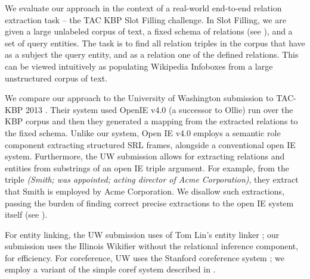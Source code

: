We evaluate our approach in the context of a real-world end-to-end 
  relation extraction task -- the TAC KBP Slot Filling challenge.
In Slot Filling, we are given a large unlabeled corpus of text, a fixed
  schema of relations (see ), and a set of
  query entities.
The task is to find all relation triples in the corpus that have as a subject
  the query entity, and as a relation one of the defined relations.
This can be viewed intuitively as populating Wikipedia Infoboxes from a large
  unstructured corpus of text.

We compare our approach to the University of Washington submission to
  TAC-KBP 2013 \cite{key:2013soderland-kbp}.
Their system used OpenIE v4.0 (a successor to Ollie) 
  run over the KBP corpus and then they generated a mapping from the 
  extracted relations to the fixed schema.
Unlike our system, Open IE v4.0 employs a semantic role
  component extracting structured SRL frames, alongside a conventional
  open IE system.
Furthermore, the UW submission allows for extracting relations and entities
  from substrings of an open IE triple argument.
For example, from the triple \textit{(Smith; was appointed; acting director of Acme
  Corporation)}, they extract that Smith is employed by Acme Corporation.
We disallow such extractions, passing the burden of finding correct
  precise extractions to the open IE system itself (see ).

For entity linking, the UW submission uses of Tom Lin's entity linker
  \cite{key:2012lin-el}; our submission uses the Illinois Wikifier 
  \cite{key:2011ratinov-el} without the relational inference component, for
  efficiency.
For coreference, UW uses the Stanford coreference system
  \cite{key:stanford-coref}; we employ a variant of the simple coref system
  described in \cite{key:2014pink-kbp}.

